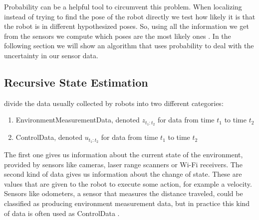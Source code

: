 Probability can be a helpful tool to circumvent this problem. When localizing instead of trying to find the pose of the robot directly we test how likely it is that the robot is in different hypothesized poses. So, using all the information we get from the sensors we compute which poses are the most likely ones \citep[p.\ 5]{Thrun:2005:PR:1121596}. In the following section we will show an algorithm that uses probability to deal with the uncertainty in our sensor data.
\subsection{Recursive State Estimation}
\citet{Thrun:2005:PR:1121596} divide the data usually collected by robots into two different categories:
\begin{enumerate}
	\setlength\itemsep{0 em}
	\item \Gls{EnvironmentMeasurementData}, denoted $z_{t_1:t_2}$ for data from time $t_1$ to time $t_2$
	\item \Gls{ControlData}, denoted $u_{t_1:t_2}$ for data from time $t_1$ to time $t_2$
\end{enumerate}
The first one gives us information about the current state of the environment, provided by sensors like cameras, laser range scanners or Wi-Fi receivers. The second kind of data gives us information about the change of state. These are values that are given to the robot to execute some action, for example a velocity. Sensors like odometers, a sensor that measures the distance traveled, could be classified as producing environment measurement data, but in practice this kind of data is often used as \gls{ControlData} \citep[p.\ 22-23]{Thrun:2005:PR:1121596}.

